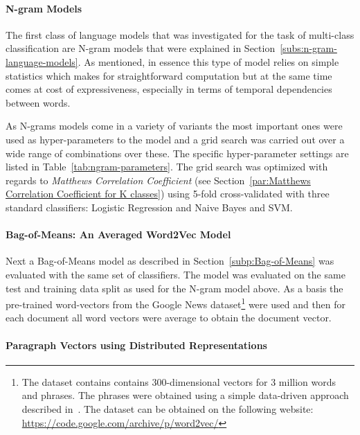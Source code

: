 \paragraph{N-gram Models}
\label{par:N-gram Models}

The first class of language models that was investigated for the task of multi-class classification are N-gram models that were explained in Section~\ref{subs:n-gram-language-models}. As mentioned, in essence this type of model relies on simple statistics which makes for straightforward computation but at the same time comes at cost of expressiveness, especially in terms of temporal dependencies between words.

As N-grams models come in a variety of variants the most important ones were used as hyper-parameters to the model and a grid search was carried out over a wide range of combinations over these. The specific hyper-parameter settings are listed in Table~\ref{tab:ngram-parameters}. The grid search was optimized with regards to \emph{Matthews Correlation Coefficient} (see Section~\ref{par:Matthews Correlation Coefficient for K classes}) using 5-fold cross-validated with three standard classifiers: Logistic Regression and Naive Bayes and SVM.

\paragraph{Bag-of-Means: An Averaged Word2Vec Model}
\label{par:Bag-of-Means: An Averaged Word2Vec Model}

Next a Bag-of-Means model as described in Section~\ref{subp:Bag-of-Means} was evaluated with the same set of classifiers. The model was evaluated on the same test and training data split as used for the N-gram model above. As a basis the pre-trained word-vectors from the Google News dataset\footnote{The dataset contains contains 300-dimensional vectors for 3 million words and phrases. The phrases were obtained using a simple data-driven approach described in~\cite{Mikolov:2013ab}. The dataset can be obtained on the following website: \url{https://code.google.com/archive/p/word2vec/}} were used and then for each document all word vectors were average to obtain the document vector.

\paragraph{Paragraph Vectors using Distributed Representations}
\label{par:Paragraph Vectors using Distributed Representations}


